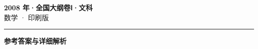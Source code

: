 \documentclass[zihao=5, a4paper]{ctexart}
\begin{document}
\begin{center}
  {\Large\bfseries 2008 年·全国大纲卷Ⅰ·文科}\\[4pt]
  {\large 数学 · 印刷版}
\end{center}
\medskip
{}

\par\bigskip\hrule\bigskip
{}
\begin{center}{\large\bfseries 参考答案与详细解析}\end{center}
\smallskip

\end{document}
